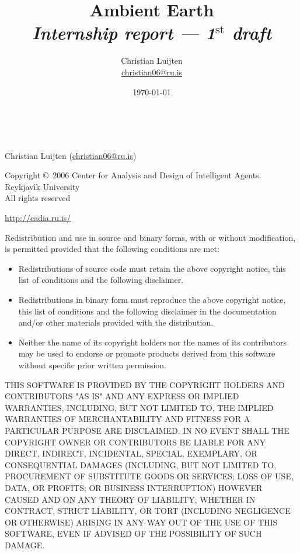 \documentclass[english,a4paper,twoside]{scrreprt}
\title{Ambient Earth\\
       {\Large \emph{Internship report --- 1$^{\text{st}}$ draft\/}}}
\author{Christian Luijten\\\url{christian06@ru.is}}
\date{\today}
\makeatletter
\newcommand{\Rvk}{Reykjav\'\i{}k }
\newcommand{\institution}{\newcommand{\@institution}}
\renewcommand\maketitle{\begin{titlepage}%
\let\footnotesize\small
\let\footnoterule\relax
\let \footnote \thanks
\null\vfil
\vskip 60\p@
\begin{center}%
  {\LARGE \@title \par}%
  \vskip 3em%
  {\large
   \lineskip .75em%
    \begin{tabular}[t]{c}%
      \@author
    \end{tabular}\par}%
    \vskip 1.5em%
  {\large \@date \par}%
\end{center}\par
\@thanks
\vfill
{\small
 \begin{flushright}
  \begin{tabular}{l}\hline
  \@institution\hline
  \end{tabular}
 \end{flushright}
}
\global\let\@institution\@empty
\global\let\institution\relax
\end{titlepage}
}
\makeatother
\begin{document}
\acrodef{RU}{\Rvk University}

\maketitle

\mbox{} \\
\vfill

\begin{adjustwidth}{4em}{4em}
{\scriptsize
  Christian Luijten (\url{christian06@ru.is})

  Copyright \copyright\ 2006 Center for Analysis and Design of Intelligent
  Agents. \\
  \Rvk{} University \\
  All rights reserved

  \url{http://cadia.ru.is/}

  Redistribution and use in source and binary forms, with or without
  modification, is permitted provided that the following conditions are met:

  \begin{itemize}
    \item Redistributions of source code must retain the above copyright
      notice, this list of conditions and the following disclaimer.

    \item Redistributions in binary form must reproduce the above copyright
      notice, this list of conditions and the following disclaimer in the
      documentation and/or other materials provided with the distribution.

    \item Neither the name of its copyright holders nor the names of its
      contributors may be used to endorse or promote products derived from this
      software without specific prior written permission.

  \end{itemize}

  THIS SOFTWARE IS PROVIDED BY THE COPYRIGHT HOLDERS AND CONTRIBUTORS "AS IS"
  AND ANY EXPRESS OR IMPLIED WARRANTIES, INCLUDING, BUT NOT LIMITED TO, THE
  IMPLIED WARRANTIES OF MERCHANTABILITY AND FITNESS FOR A PARTICULAR PURPOSE
  ARE DISCLAIMED. IN NO EVENT SHALL THE COPYRIGHT OWNER OR CONTRIBUTORS BE
  LIABLE FOR ANY DIRECT, INDIRECT, INCIDENTAL, SPECIAL, EXEMPLARY, OR
  CONSEQUENTIAL DAMAGES (INCLUDING, BUT NOT LIMITED TO, PROCUREMENT OF
  SUBSTITUTE GOODS OR SERVICES; LOSS OF USE, DATA, OR PROFITS; OR BUSINESS
  INTERRUPTION) HOWEVER CAUSED AND ON ANY THEORY OF LIABILITY, WHETHER IN
  CONTRACT, STRICT LIABILITY, OR TORT (INCLUDING NEGLIGENCE OR OTHERWISE)
  ARISING IN ANY WAY OUT OF THE USE OF THIS SOFTWARE, EVEN IF ADVISED OF THE
  POSSIBILITY OF SUCH DAMAGE.
}
\end{adjustwidth}
\end{document}
